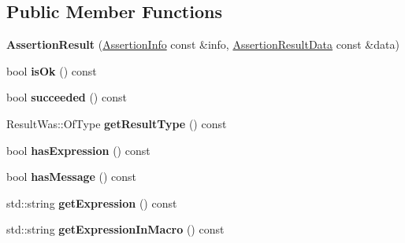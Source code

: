 \subsection*{Public Member Functions}
\begin{DoxyCompactItemize}
\item 
\mbox{\label{classCatch_1_1AssertionResult_ab58aeec27052ba400633ed0e36cea692}} 
{\bfseries Assertion\+Result} (\hyperlink{structCatch_1_1AssertionInfo}{Assertion\+Info} const \&info, \hyperlink{structCatch_1_1AssertionResultData}{Assertion\+Result\+Data} const \&data)
\item 
\mbox{\label{classCatch_1_1AssertionResult_ae39658b71c4afc3c8a859043b0e97027}} 
bool {\bfseries is\+Ok} () const
\item 
\mbox{\label{classCatch_1_1AssertionResult_ac5cc872b721d5fb65d87221d30b22fdd}} 
bool {\bfseries succeeded} () const
\item 
\mbox{\label{classCatch_1_1AssertionResult_ac810750194e1722489d2fd16e8c6a4a8}} 
Result\+Was\+::\+Of\+Type {\bfseries get\+Result\+Type} () const
\item 
\mbox{\label{classCatch_1_1AssertionResult_aba37b4fef1015989df2136592958e984}} 
bool {\bfseries has\+Expression} () const
\item 
\mbox{\label{classCatch_1_1AssertionResult_aae37064b401919fa8ac480ef86cca924}} 
bool {\bfseries has\+Message} () const
\item 
\mbox{\label{classCatch_1_1AssertionResult_a26a777f3959353c729544cb2ace0d279}} 
std\+::string {\bfseries get\+Expression} () const
\item 
\mbox{\label{classCatch_1_1AssertionResult_aac35a0ca42d33bff6467c76573730f5e}} 
std\+::string {\bfseries get\+Expression\+In\+Macro} () const
\item 
\mbox{\label{classCatch_1_1AssertionResult_a78c43506c2b3d8cc1fb141a97d09ec94}} 

\end{DoxyCompactItemize}

